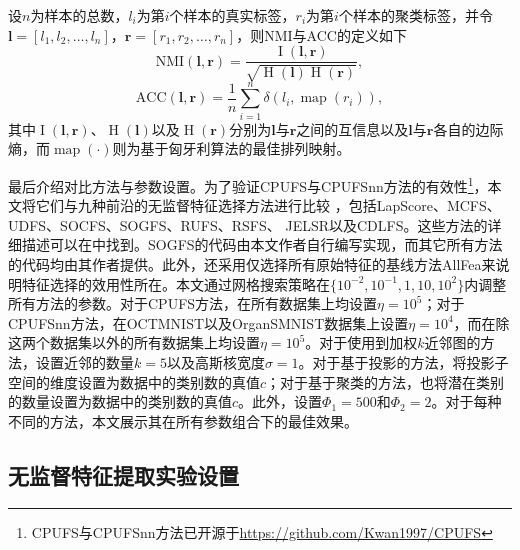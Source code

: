 设$n$为样本的总数，$l_i$为第$i$个样本的真实标签，$r_i$为第$i$个样本的聚类标签，并令$\boldsymbol{l}=[l_{1},l_{2},\ldots,l_{n}]$，$\boldsymbol{r}=[r_{1},r_{2},\ldots,r_{n}]$，则NMI与ACC的定义如下
\begin{equation*}
\text{NMI}(\boldsymbol{l}, \boldsymbol{r})=\frac{\operatorname{I}(\boldsymbol{l}, \boldsymbol{r})}{\sqrt{\operatorname{H}(\boldsymbol{l}) \operatorname{H}(\boldsymbol{r})}},
\end{equation*}
\begin{equation*}
    \text {ACC}(\boldsymbol{l}, \boldsymbol{r}) = \frac {1} { n } \sum _ { i = 1 } ^ { n } \delta \left( l _ { i }, \operatorname { map } \left( r _ { i } \right) \right) ,
\end{equation*}
其中$\operatorname{I}(\boldsymbol{l},\boldsymbol{r})$、$\operatorname{H}(\boldsymbol{l})$以及$\operatorname{H}(\boldsymbol{r})$分别为$\boldsymbol{l}$与$\boldsymbol{r}$之间的互信息以及$\boldsymbol{l}$与$\boldsymbol{r}$各自的边际熵，而$\operatorname{map}(\cdot)$则为基于匈牙利算法的最佳排列映射。

最后介绍对比方法与参数设置。为了验证CPUFS与CPUFSnn方法的有效性\footnote{CPUFS与CPUFSnn方法已开源于\url{https://github.com/Kwan1997/CPUFS}}，本文将它们与九种前沿的无监督特征选择方法进行比较
，包括LapScore、MCFS、UDFS、SOCFS、SOGFS、RUFS、RSFS、 JELSR以及CDLFS。这些方法的详细描述可以在中找到。SOGFS的代码由本文作者自行编写实现，而其它所有方法的代码均由其作者提供。此外，还采用仅选择所有原始特征的基线方法AllFea来说明特征选择的效用性所在。本文通过网格搜索策略在$\{10^{-2},10^{-1},1,\allowbreak 10,\allowbreak 10^{2}\}$内调整所有方法的参数。对于CPUFS方法，在所有数据集上均设置$\eta=10^{5}$；对于CPUFSnn方法，在OCTMNIST以及OrganSMNIST数据集上设置$\eta=10^{4}$，而在除这两个数据集以外的所有数据集上均设置$\eta=10^{5}$。对于使用到加权$k$近邻图的方法，设置近邻的数量$k=5$以及高斯核宽度$\sigma=1$。对于基于投影的方法，将投影子空间的维度设置为数据中的类别数的真值$c$；对于基于聚类的方法，也将潜在类别的数量设置为数据中的类别数的真值$c$。此外，设置$\Phi_{1}=500$和$\Phi_{2}=2$。对于每种不同的方法，本文展示其在所有参数组合下的最佳效果。


\subsection{无监督特征提取实验设置}\label{sec:expsetup-ufe}


